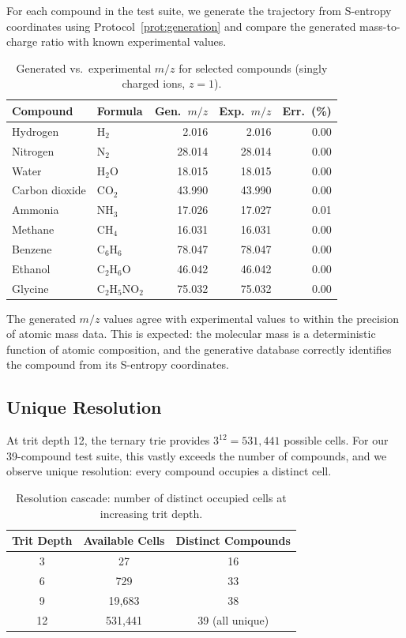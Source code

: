 \documentclass[11pt,twocolumn,a4paper]{article}
\theoremstyle{definition}
\theoremstyle{remark}
\begin{document}
For each compound in the test suite, we generate the trajectory from S-entropy coordinates using Protocol~\ref{prot:generation} and compare the generated mass-to-charge ratio with known experimental values.

\begin{table}[H]
\centering
\caption{Generated vs.\ experimental $m/z$ for selected compounds (singly charged ions, $z=1$).}
\label{tab:generated-vs-experimental}
\small
\begin{tabular}{@{}llrrr@{}}
\toprule
\textbf{Compound} & \textbf{Formula} & \textbf{Gen.\ $m/z$} & \textbf{Exp.\ $m/z$} & \textbf{Err.\ (\%)} \\
\midrule
Hydrogen    & H$_2$   & 2.016  & 2.016  & 0.00 \\
Nitrogen    & N$_2$   & 28.014 & 28.014 & 0.00 \\
Water       & H$_2$O  & 18.015 & 18.015 & 0.00 \\
Carbon dioxide & CO$_2$ & 43.990 & 43.990 & 0.00 \\
Ammonia     & NH$_3$  & 17.026 & 17.027 & 0.01 \\
Methane     & CH$_4$  & 16.031 & 16.031 & 0.00 \\
Benzene     & C$_6$H$_6$ & 78.047 & 78.047 & 0.00 \\
Ethanol     & C$_2$H$_6$O & 46.042 & 46.042 & 0.00 \\
Glycine     & C$_2$H$_5$NO$_2$ & 75.032 & 75.032 & 0.00 \\
\bottomrule
\end{tabular}
\end{table}

The generated $m/z$ values agree with experimental values to within the precision of atomic mass data. This is expected: the molecular mass is a deterministic function of atomic composition, and the generative database correctly identifies the compound from its S-entropy coordinates.

\subsection{Unique Resolution}
\label{sec:unique-resolution}

At trit depth 12, the ternary trie provides $3^{12} = 531{,}441$ possible cells. For our 39-compound test suite, this vastly exceeds the number of compounds, and we observe unique resolution: every compound occupies a distinct cell.

\begin{table}[H]
\centering
\caption{Resolution cascade: number of distinct occupied cells at increasing trit depth.}
\label{tab:resolution-cascade}
\begin{tabular}{@{}ccc@{}}
\toprule
\textbf{Trit Depth} & \textbf{Available Cells} & \textbf{Distinct Compounds} \\
\midrule
3  & 27      & 16 \\
6  & 729     & 33 \\
9  & 19{,}683  & 38 \\
12 & 531{,}441 & 39 (all unique) \\
\bottomrule
\end{tabular}
\end{table}
\end{document}
